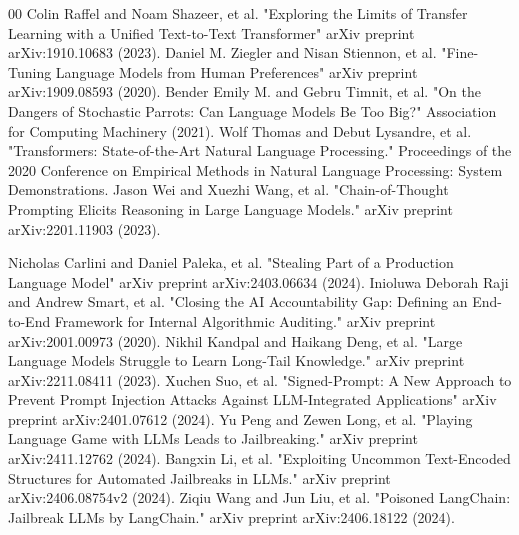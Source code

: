 \documentclass[conference]{IEEEtran}
\begin{document}
\begin{thebibliography}{00}
 Colin Raffel and Noam Shazeer, et al. "Exploring the Limits of Transfer Learning with a Unified Text-to-Text Transformer" arXiv preprint arXiv:1910.10683 (2023).
 Daniel M. Ziegler and Nisan Stiennon, et al. "Fine-Tuning Language Models from Human Preferences" arXiv preprint arXiv:1909.08593 (2020).
 Bender Emily M. and Gebru Timnit, et al. "On the Dangers of Stochastic Parrots: Can Language Models Be Too Big?" Association for Computing Machinery (2021).
 Wolf Thomas  and Debut Lysandre, et al. "Transformers: State-of-the-Art Natural Language Processing." Proceedings of the 2020 Conference on Empirical Methods in Natural Language Processing: System Demonstrations.
 Jason Wei and Xuezhi Wang, et al. "Chain-of-Thought Prompting Elicits Reasoning in Large Language Models." arXiv preprint arXiv:2201.11903 (2023).

 Nicholas Carlini and Daniel Paleka, et al. "Stealing Part of a Production Language Model" arXiv preprint arXiv:2403.06634 (2024).
 Inioluwa Deborah Raji and Andrew Smart, et al. "Closing the AI Accountability Gap: Defining an End-to-End Framework for Internal Algorithmic Auditing." arXiv preprint arXiv:2001.00973 (2020).
 Nikhil Kandpal and Haikang Deng, et al. "Large Language Models Struggle to Learn Long-Tail Knowledge." arXiv preprint arXiv:2211.08411 (2023).
 Xuchen Suo, et al. "Signed-Prompt: A New Approach to Prevent Prompt Injection Attacks Against LLM-Integrated Applications" arXiv preprint arXiv:2401.07612 (2024).
 Yu Peng and Zewen Long, et al. "Playing Language Game with LLMs Leads to Jailbreaking." arXiv preprint arXiv:2411.12762 (2024).
 Bangxin Li, et al. "Exploiting Uncommon Text-Encoded Structures for Automated Jailbreaks in LLMs." arXiv preprint arXiv:2406.08754v2 (2024).
 Ziqiu Wang and Jun Liu, et al. "Poisoned LangChain: Jailbreak LLMs by LangChain." arXiv preprint arXiv:2406.18122 (2024).


\end{thebibliography}
\end{document}
